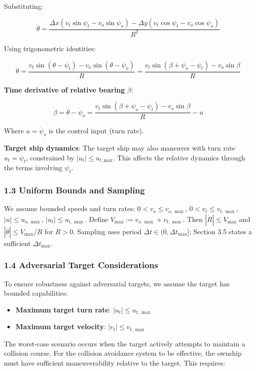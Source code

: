 \documentclass[11pt,a4paper]{article}
\numberwithin{equation}{section}
\begin{document}
Substituting:

\[
\dot{\theta} = \frac{\Delta x(v_t\sin\psi_t - v_o\sin\psi_o) - \Delta y(v_t\cos\psi_t - v_o\cos\psi_o)}{R^2}
\]

Using trigonometric identities:

\[
\dot{\theta} = \frac{v_t\sin(\theta - \psi_t) - v_o\sin(\theta - \psi_o)}{R} = \frac{v_t\sin(\beta + \psi_o - \psi_t) - v_o\sin\beta}{R}
\]

\textbf{Time derivative of relative bearing} $\beta$:

\[
\dot{\beta} = \dot{\theta} - \dot{\psi}_o = \frac{v_t\sin(\beta + \psi_o - \psi_t) - v_o\sin\beta}{R} - u
\]

Where $u = \dot{\psi}_o$ is the control input (turn rate).

\textbf{Target ship dynamics}: The target ship may also maneuver with turn rate $u_t = \dot{\psi}_t$, constrained by $\lvert u_t \rvert \le u_{t,\mathrm{max}}$. This affects the relative dynamics through the terms involving $\psi_t$.

\subsubsection{1.3 Uniform Bounds and Sampling}

We assume bounded speeds and turn rates: $0<v_o\le v_{o,\max}$, $0<v_t\le v_{t,\max}$, $|u|\le u_{o,\max}$, $|u_t|\le u_{t,\max}$. Define $V_{\max}:=v_{o,\max}+v_{t,\max}$. Then $|\dot R|\le V_{\max}$ and $|\dot \theta|\le V_{\max}/R$ for $R>0$. Sampling uses period $\Delta t\in (0,\Delta t_{\max}]$; Section 3.5 states a sufficient $\Delta t_{\max}$.

\subsubsection{1.4 Adversarial Target Considerations}

To ensure robustness against adversarial targets, we assume the target has bounded capabilities:
\begin{itemize}
\item \textbf{Maximum target turn rate}: $|u_t| \leq u_{t,\max}$
\item \textbf{Maximum target velocity}: $|v_t| \leq v_{t,\max}$
\end{itemize}

The worst-case scenario occurs when the target actively attempts to maintain a collision course. For the collision avoidance system to be effective, the ownship must have sufficient maneuverability relative to the target. This requires:
\end{document}
